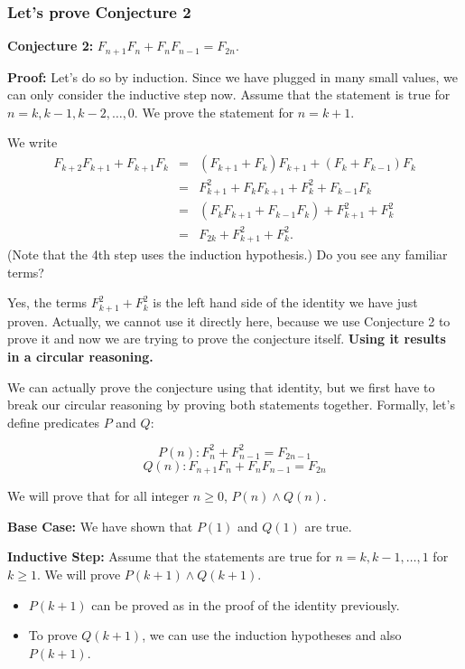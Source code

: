 \begin{frame}\frametitle{Let's prove Conjecture 2}
  {\bf Conjecture 2:} $F_{n+1}F_n + F_nF_{n-1}=F_{2n}$.
  
  {\bf Proof:} Let's do so by induction.  Since we have plugged in
  many small values, we can only consider the inductive step now.
  Assume that the statement is true for $n=k,k-1,k-2,\ldots,0$.  We
  prove the statement for $n=k+1$.

  We write
  \begin{eqnarray*}
    F_{k+2}F_{k+1}+F_{k+1}F_k
    &=& (F_{k+1} + F_k)F_{k+1} + (F_k+F_{k-1})F_k \\
    &=& F_{k+1}^2 + F_kF_{k+1} + F_k^2 + F_{k-1}F_k \\
    &=& (F_kF_{k+1} + F_{k-1}F_k) + F_{k+1}^2 + F_k^2 \\
    &=& F_{2k} + F_{k+1}^2 + F_k^2.
  \end{eqnarray*}
  (Note that the 4th step uses the induction hypothesis.)  Do you see
  any familiar terms?

  \vspace{0.1in} Yes, the terms $F_{k+1}^2 + F_k^2$ is the left hand
  side of the identity we have just proven.  Actually, we cannot use
  it directly here, because we use Conjecture 2 to prove it and now we
  are trying to prove the conjecture itself.  {\bf Using it results in
    a circular reasoning.}
\end{frame}

\begin{frame}
  We can actually prove the conjecture using that identity, but we
  first have to break our circular reasoning by proving both
  statements together.  Formally, let's define predicates $P$ and $Q$:

  \begin{tcolorbox}
    \[P(n): F_n^2 +F_{n-1}^2 = F_{2n-1}\]
    \[Q(n): F_{n+1}F_n + F_nF_{n-1} = F_{2n}\]
  \end{tcolorbox}

  We will prove that for all integer $n\geq 0$, $P(n)\wedge Q(n)$.
    
  {\bf Base Case:} We have shown that $P(1)$ and $Q(1)$ are true.
  
  {\bf Inductive Step:} Assume that the statements are true for
  $n=k,k-1,\ldots,1$ for $k\geq 1$.  We will prove $P(k+1)\wedge
  Q(k+1)$.
  \begin{itemize}
  \item $P(k+1)$ can be proved as in the proof of the identity
    previously.
  \item To prove $Q(k+1)$, we can use the induction hypotheses and
    also $P(k+1)$.
  \end{itemize}
\end{frame}

